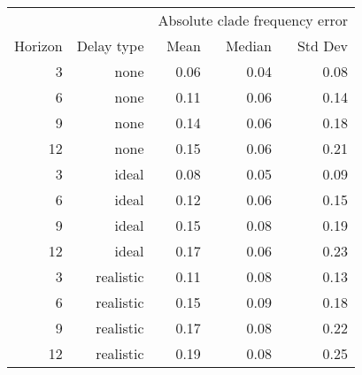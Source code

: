 
\begin{tabular*}{0.7\textwidth}{rrrrr}
\toprule
        &            & \multicolumn{3}{c}{Absolute clade frequency error} \\
Horizon & Delay type & Mean & Median & Std Dev \\
\midrule

3 & none & 0.06 & 0.04 & 0.08 \\
6 & none & 0.11 & 0.06 & 0.14 \\
9 & none & 0.14 & 0.06 & 0.18 \\
12 & none & 0.15 & 0.06 & 0.21 \\
3 & ideal & 0.08 & 0.05 & 0.09 \\
6 & ideal & 0.12 & 0.06 & 0.15 \\
9 & ideal & 0.15 & 0.08 & 0.19 \\
12 & ideal & 0.17 & 0.06 & 0.23 \\
3 & realistic & 0.11 & 0.08 & 0.13 \\
6 & realistic & 0.15 & 0.09 & 0.18 \\
9 & realistic & 0.17 & 0.08 & 0.22 \\
12 & realistic & 0.19 & 0.08 & 0.25 \\

\bottomrule
\end{tabular*}

